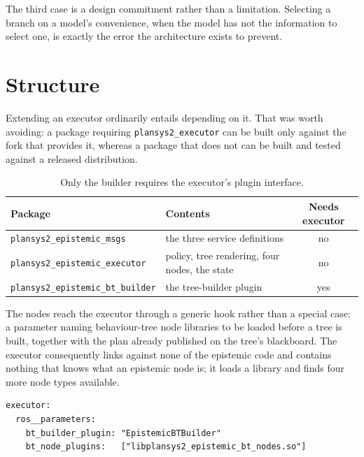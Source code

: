 \documentclass[11pt,a4paper]{article}
\theoremstyle{definition}
\newcommand{\code}[1]{\texttt{\small #1}}
\begin{document}
\noindent The third case is a design commitment rather than a limitation.
Selecting a branch on a model's convenience, when the model has not the
information to select one, is exactly the error the architecture exists to
prevent.

\section{Structure}
\label{sec:structure}

Extending an executor ordinarily entails depending on it. That was worth
avoiding: a package requiring \code{plansys2\_executor} can be built only against
the fork that provides it, whereas a package that does not can be built and
tested against a released distribution.

\begin{table}[H]
\centering
\small
\begin{tabularx}{\textwidth}{@{}lXc@{}}
\toprule
\textbf{Package} & \textbf{Contents} & \textbf{Needs executor} \\
\midrule
\code{plansys2\_epistemic\_msgs}       & the three service definitions & no \\
\code{plansys2\_epistemic\_executor}   & policy, tree rendering, four nodes, the state & no \\
\code{plansys2\_epistemic\_bt\_builder}& the tree-builder plugin & yes \\
\bottomrule
\end{tabularx}
\caption{Only the builder requires the executor's plugin interface.}
\label{tab:packages}
\end{table}

The nodes reach the executor through a generic hook rather than a special case: a
parameter naming behaviour-tree node libraries to be loaded before a tree is
built, together with the plan already published on the tree's blackboard. The
executor consequently links against none of the epistemic code and contains
nothing that knows what an epistemic node is; it loads a library and finds four
more node types available.

\begin{lstlisting}[caption={The entire configuration, above the ordinary PlanSys2 parameters.}]
executor:
  ros__parameters:
    bt_builder_plugin: "EpistemicBTBuilder"
    bt_node_plugins:   ["libplansys2_epistemic_bt_nodes.so"]
\end{lstlisting}
\end{document}

